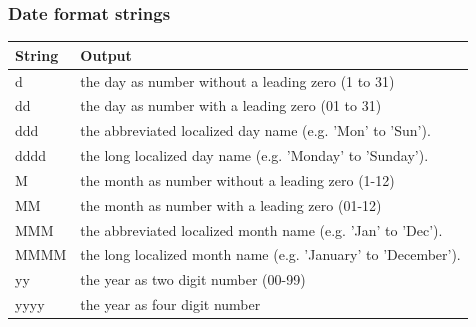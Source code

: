 \begin{frame}
  \frametitle{Date format strings}
  \scriptsize
  \begin{center}
  \begin{tabular}{|p{}|p{}|}
    \hline
    \textbf{String} & \textbf{Output} \\
    \hline
    d & the day as number without a leading zero (1 to 31) \\
    \hline
    dd & the day as number with a leading zero (01 to 31) \\
    \hline
    ddd & the abbreviated localized day name (e.g. 'Mon' to 'Sun'). \\
    \hline
    dddd & the long localized day name (e.g. 'Monday' to 'Sunday'). \\
    \hline
    M & the month as number without a leading zero (1-12) \\
    \hline
    MM & the month as number with a leading zero (01-12) \\
    \hline
    MMM & the abbreviated localized month name (e.g. 'Jan' to 'Dec'). \\
    \hline
    MMMM & the long localized month name (e.g. 'January' to 'December'). \\
    \hline
    yy & the year as two digit number (00-99) \\
    \hline
    yyyy & the year as four digit number \\
    \hline
  \end{tabular}
  \end{center}
\end{frame}

